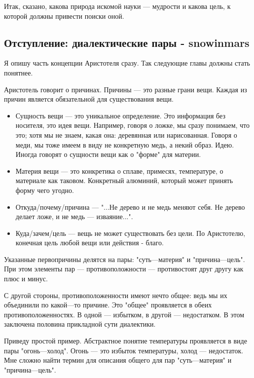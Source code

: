 \documentclass[oneside, 17pt, dvipsnames]{extbook}
\begin{document}
Итак, сказано, какова природа искомой науки --- мудрости и какова цель, к которой должны привести поиски оной.






\newpage
\subsection{Отступление: диалектические пары - snowinmars}

Я опишу часть концепции Аристотеля сразу. Так следующие главы должны стать понятнее.

Аристотель говорит о причинах. Причины --- это разные грани вещи. Каждая из причин является обязательной для существования вещи.

\begin{itemize}
\item Сущность вещи --- это уникальное определение. Это информация без носителя, это идея вещи. Например, говоря о ложке, мы сразу понимаем, что это; хотя мы не знаем, какая она: деревянная или нарисованная. Говоря о меди, мы тоже имеем в виду не конкретную медь, а некий образ. Идею. Иногда говорят о сущности вещи как о "форме" для материи.
\item Материя вещи --- это конкретика о сплаве, примесях, температуре, о материале как таковом. Конкретный алюминий, который может принять форму чего угодно.
\item Откуда/почему/причина --- "...Не дерево и не медь меняют себя. Не дерево делает ложе, и не медь --- изваяние...".
\item Куда/зачем/цель --- вещь не может существовать без цели. По Аристотелю, конечная цель любой вещи или действия - благо.
\end{itemize}

Указанные первопричины делятся на пары: "суть---материя" и "причина---цель". При этом элементы пар --- противоположности --- противостоят друг другу как плюс и минус.

С другой стороны, противоположенности имеют нечто общее: ведь мы их объединили по какой---то причине. Это "общее" проявляется в обеих противоположенностях. В одной --- избытком, в другой --- недостатком. В этом заключена половина прикладной сути диалектики.

Приведу простой пример. Абстрактное понятие температуры проявляется в виде пары "огонь---холод". Огонь --- это избыток температуры, холод --- недостаток. Мне сложно найти термин для описания общего для пар "суть---материя" и "причина---цель".
\end{document}

